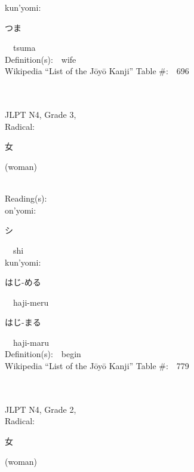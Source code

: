 \begin{multicols}{2}
{\hspace*{1em}}kun'yomi:\ \ \\
{\hspace*{2em}}{\begin{CJK}{UTF8}{min} つま \end{CJK}}\ \ tsuma\ \ \\
Definition(s):\ \ wife \\
Wikipedia ``List of the J\=oy\=o Kanji'' Table \#:\ \ 696 \\
\ \ \\
{\fontsize{34pt}{40pt}  }\ \ \\  %
{JLPT N4, Grade 3, \\Radical:\ \ {\begin{CJK}{UTF8}{min} 女 \end{CJK}} (woman) } \\
Reading(s):\ \ \\
{\hspace*{1em}}on'yomi:\ \ \\
{\hspace*{2em}}{\begin{CJK}{UTF8}{min} シ \end{CJK}}\ \ shi\ \ \\
{\hspace*{1em}}kun'yomi:\ \ \\
{\hspace*{2em}}{\begin{CJK}{UTF8}{min} はじ-める \end{CJK}}\ \ haji-meru\ \ \\
{\hspace*{2em}}{\begin{CJK}{UTF8}{min} はじ-まる \end{CJK}}\ \ haji-maru\ \ \\
Definition(s):\ \ begin \\
Wikipedia ``List of the J\=oy\=o Kanji'' Table \#:\ \ 779 \\
\ \ \\
{\fontsize{34pt}{40pt}  }\ \ \\  %
{JLPT N4, Grade 2, \\Radical:\ \ {\begin{CJK}{UTF8}{min} 女 \end{CJK}} (woman) } \\

\end{multicols}
